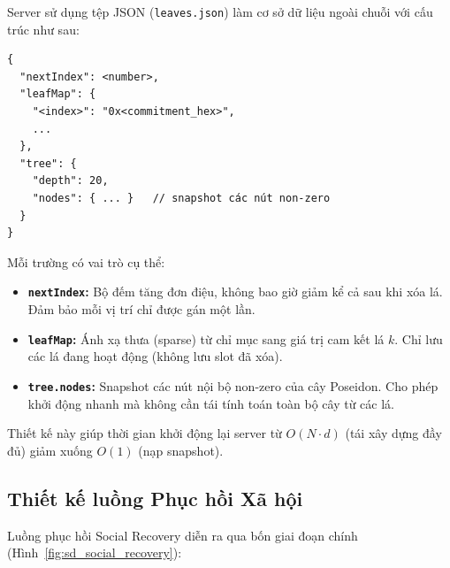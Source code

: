 \documentclass[../DoAn.tex]{subfiles}
\begin{document}
Server sử dụng tệp JSON (\texttt{leaves.json}) làm cơ sở dữ liệu ngoài chuỗi với cấu trúc như sau:

\begin{verbatim}
{
  "nextIndex": <number>,
  "leafMap": {
    "<index>": "0x<commitment_hex>",
    ...
  },
  "tree": {
    "depth": 20,
    "nodes": { ... }   // snapshot các nút non-zero
  }
}
\end{verbatim}

Mỗi trường có vai trò cụ thể:
\begin{itemize}
    \item \textbf{\texttt{nextIndex}:} Bộ đếm tăng đơn điệu, không bao giờ giảm kể cả sau khi xóa lá. Đảm bảo mỗi vị trí chỉ được gán một lần.
    \item \textbf{\texttt{leafMap}:} Ánh xạ thưa (sparse) từ chỉ mục sang giá trị cam kết lá $k$. Chỉ lưu các lá đang hoạt động (không lưu slot đã xóa).
    \item \textbf{\texttt{tree.nodes}:} Snapshot các nút nội bộ non-zero của cây Poseidon. Cho phép khởi động nhanh mà không cần tái tính toán toàn bộ cây từ các lá.
\end{itemize}

Thiết kế này giúp thời gian khởi động lại server từ $O(N \cdot d)$ (tái xây dựng đầy đủ) giảm xuống $O(1)$ (nạp snapshot).

\subsection{Thiết kế luồng Phục hồi Xã hội}
\label{subsec:recovery_flow}

Luồng phục hồi Social Recovery diễn ra qua bốn giai đoạn chính (Hình~\ref{fig:sd_social_recovery}):
\end{document}
